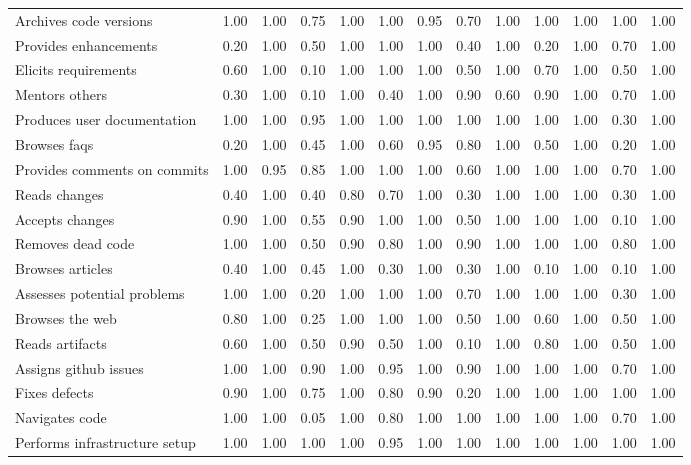 \begin{tabular}{lrrrrrrrrrrrr}
Archives code versions & 1.00 & 1.00 & 0.75 & 1.00 & 1.00 & 0.95 & 0.70 & 1.00 & 1.00 & 1.00 & 1.00 & 1.00 \\
Provides enhancements & 0.20 & 1.00 & 0.50 & 1.00 & 1.00 & 1.00 & 0.40 & 1.00 & 0.20 & 1.00 & 0.70 & 1.00 \\
Elicits requirements & 0.60 & 1.00 & 0.10 & 1.00 & 1.00 & 1.00 & 0.50 & 1.00 & 0.70 & 1.00 & 0.50 & 1.00 \\
Mentors others & 0.30 & 1.00 & 0.10 & 1.00 & 0.40 & 1.00 & 0.90 & 0.60 & 0.90 & 1.00 & 0.70 & 1.00 \\
Produces user documentation & 1.00 & 1.00 & 0.95 & 1.00 & 1.00 & 1.00 & 1.00 & 1.00 & 1.00 & 1.00 & 0.30 & 1.00 \\
Browses faqs & 0.20 & 1.00 & 0.45 & 1.00 & 0.60 & 0.95 & 0.80 & 1.00 & 0.50 & 1.00 & 0.20 & 1.00 \\
Provides comments on commits & 1.00 & 0.95 & 0.85 & 1.00 & 1.00 & 1.00 & 0.60 & 1.00 & 1.00 & 1.00 & 0.70 & 1.00 \\
Reads changes & 0.40 & 1.00 & 0.40 & 0.80 & 0.70 & 1.00 & 0.30 & 1.00 & 1.00 & 1.00 & 0.30 & 1.00 \\
Accepts changes & 0.90 & 1.00 & 0.55 & 0.90 & 1.00 & 1.00 & 0.50 & 1.00 & 1.00 & 1.00 & 0.10 & 1.00 \\
Removes dead code & 1.00 & 1.00 & 0.50 & 0.90 & 0.80 & 1.00 & 0.90 & 1.00 & 1.00 & 1.00 & 0.80 & 1.00 \\
Browses articles & 0.40 & 1.00 & 0.45 & 1.00 & 0.30 & 1.00 & 0.30 & 1.00 & 0.10 & 1.00 & 0.10 & 1.00 \\
Assesses potential problems & 1.00 & 1.00 & 0.20 & 1.00 & 1.00 & 1.00 & 0.70 & 1.00 & 1.00 & 1.00 & 0.30 & 1.00 \\
Browses the web & 0.80 & 1.00 & 0.25 & 1.00 & 1.00 & 1.00 & 0.50 & 1.00 & 0.60 & 1.00 & 0.50 & 1.00 \\
Reads artifacts & 0.60 & 1.00 & 0.50 & 0.90 & 0.50 & 1.00 & 0.10 & 1.00 & 0.80 & 1.00 & 0.50 & 1.00 \\
Assigns github issues & 1.00 & 1.00 & 0.90 & 1.00 & 0.95 & 1.00 & 0.90 & 1.00 & 1.00 & 1.00 & 0.70 & 1.00 \\
Fixes defects & 0.90 & 1.00 & 0.75 & 1.00 & 0.80 & 0.90 & 0.20 & 1.00 & 1.00 & 1.00 & 1.00 & 1.00 \\
Navigates code & 1.00 & 1.00 & 0.05 & 1.00 & 0.80 & 1.00 & 1.00 & 1.00 & 1.00 & 1.00 & 0.70 & 1.00 \\
Performs infrastructure setup & 1.00 & 1.00 & 1.00 & 1.00 & 0.95 & 1.00 & 1.00 & 1.00 & 1.00 & 1.00 & 1.00 & 1.00 \\

\end{tabular}
